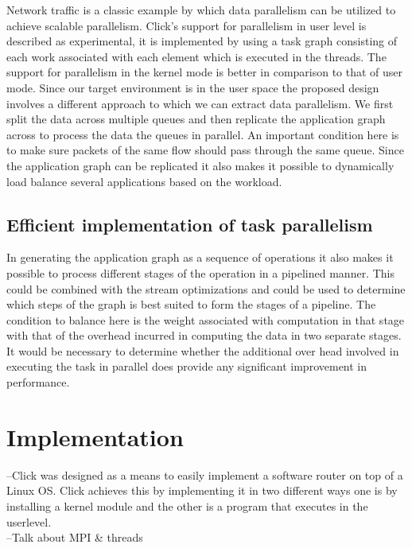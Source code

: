 \documentclass[prodmode,acmtaco]{acmsmall}
\begin{document}
Network traffic is a classic example by which data parallelism can be utilized to achieve scalable parallelism. Click's support for parallelism in user level is described as experimental, it is implemented by using a task graph consisting of each work associated with each element which is executed in the threads. The support for parallelism in the kernel mode is better in comparison to that of user mode. Since our target environment is in the user space the proposed design involves a different approach to which we can extract data parallelism. We first split the data across multiple queues and then replicate the application graph across to process the data the queues in parallel. An important condition here is to make sure packets of the same flow should pass through the same queue. Since the application graph can be replicated it also makes it possible to dynamically load balance several applications based on the workload.   

\subsection{Efficient implementation of task parallelism}

In generating the application graph as a sequence of operations it also makes it possible to process different stages of the operation in a pipelined manner. This could be combined with the stream optimizations and could be used to determine which steps of the graph is best suited to form the stages of a pipeline. The condition to balance here is the weight associated with computation in that stage with that of the overhead incurred in computing the data in two separate stages. It would be necessary to determine whether the additional over head involved in executing the task in parallel does provide any significant improvement in performance. 

\section{Implementation}

--Click was designed as a means to easily implement a software router on top of a Linux OS. Click achieves this by implementing it in two different ways one is by installing a kernel module and the other is a program that executes in the userlevel. \\

--Talk about MPI \& threads\\
\end{document}
